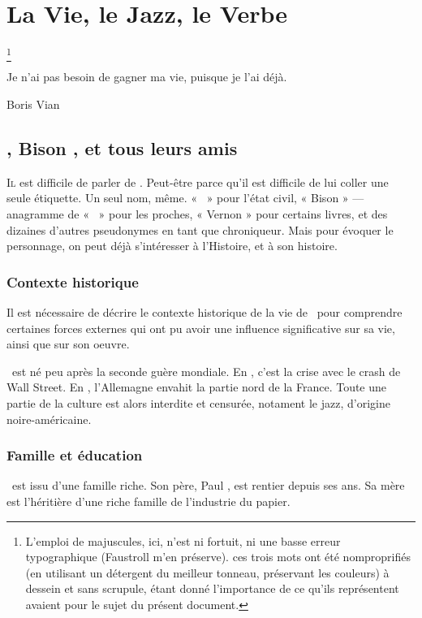 \mainmatter
\chapter{La Vie, le Jazz, le Verbe}\footnote{L'emploi de majuscules, ici,
n'est ni fortuit, ni une basse erreur typographique (Faustroll m'en préserve). ces trois mots ont été nomproprifiés (en utilisant un détergent du
meilleur tonneau, préservant les couleurs) à dessein et sans scrupule,
étant donné l'importance de ce qu'ils représentent avaient pour le sujet du
présent document.}
\epigraph{%
Je n'ai pas besoin de gagner ma vie, puisque je l'ai déjà.}{Boris Vian}

\vfill
\pagebreak
\section{\BV, Bison , et tous leurs amis}


\lettrine{I}l est difficile de parler de \BV. Peut-être parce qu'il
est difficile de lui coller une seule étiquette. Un seul nom,
même. « \BV\ » pour l'état civil, « Bison  » --- anagramme
de « \BV\ » pour les proches, « Vernon  » pour certains
livres, et des dizaines d'autres pseudonymes en tant que chroniqueur.
Mais pour évoquer le personnage, on peut déjà s'intéresser à l'Histoire,
et à son histoire.

\subsection{Contexte historique}
Il est nécessaire de décrire le contexte historique de la vie
de \BV\ pour comprendre certaines forces externes qui
ont pu avoir une influence significative sur sa vie, ainsi que
sur son oeuvre.

\BV\ est né peu après la seconde guère mondiale. En , c'est
la crise avec le crash de Wall Street. En , l'Allemagne envahit la
partie nord de la France. Toute une partie de la culture est alors
interdite et censurée, notament le jazz, d'origine noire-américaine.

\subsection{Famille et éducation}

\BV \ est issu d'une famille riche. Son père, Paul , est rentier
depuis ses  ans. Sa mère est l'héritière d'une riche famille de l'industrie
du papier.

